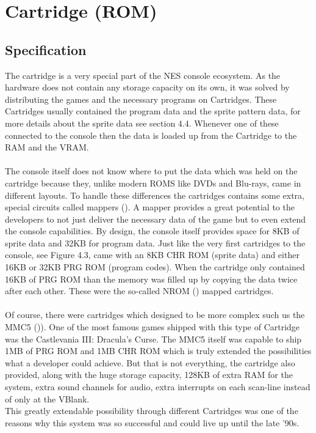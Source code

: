 \documentclass[]{report}
\begin{document}
\section{Cartridge (ROM)}

\subsection{Specification}
The cartridge is a very special part of the NES console ecosystem. As the hardware does not contain any storage capacity on its own, it was solved by distributing the games and the necessary programs on Cartridges. These Cartridges usually contained the program data and the sprite pattern data, for more details about the sprite data see section 4.4. Whenever one of these connected to the console then the data is loaded up from the Cartridge to the RAM and the VRAM.
\paragraph{ }
The console itself does not know where to put the data which was held on the cartridge because they, unlike modern ROMS like DVDs and Blu-rays, came in different layouts. To handle these differences the cartridges contains some extra, special circuits called mappers (\cite{MPPR}). A mapper provides a great potential to the developers to not just deliver the necessary data of the game but to even extend the console capabilities. By design, the console itself provides space for 8KB of sprite data and 32KB for program data. Just like the very first cartridges to the console, see Figure 4.3, came with an 8KB CHR ROM (sprite data) and either 16KB or 32KB PRG ROM (program codes). When the cartridge only contained 16KB of PRG ROM than the memory was filled up by copying the data twice after each other. These were the so-called NROM (\cite{NROM}) mapped cartridges.
\paragraph{ }
Of course, there were cartridges which designed to be more complex such us the MMC5 (\cite{MMC5})). One of the most famous games shipped with this type of Cartridge was the Castlevania III: Dracula's Curse.
The MMC5 itself was capable to ship 1MB of PRG ROM and 1MB CHR ROM which is truly extended the possibilities what a developer could achieve. But that is not everything, the cartridge also provided, along with the huge storage capacity, 128KB of extra RAM for the system, extra sound channels for audio, extra interrupts on each scan-line instead of only at the VBlank. 
\\
This greatly extendable possibility through different Cartridges was one of the reasons why this system was so successful and could live up until the late '90s.
\end{document}
